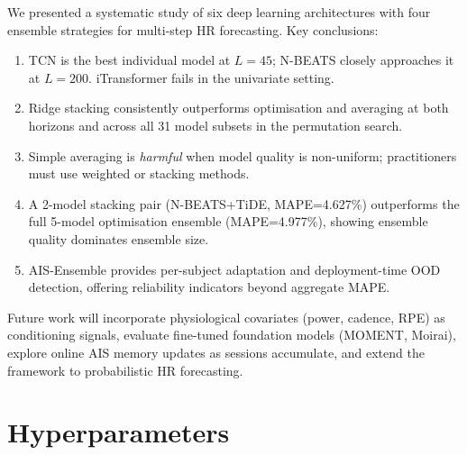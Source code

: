 \documentclass[conference]{IEEEtran}
\begin{document}
We presented a systematic study of six deep learning architectures with four
ensemble strategies for multi-step HR forecasting.  Key conclusions:
\begin{enumerate}[noitemsep,topsep=2pt]
  \item TCN is the best individual model at $L=45$; N-BEATS closely approaches
        it at $L=200$.  iTransformer fails in the univariate setting.
  \item Ridge stacking consistently outperforms optimisation and averaging at
        both horizons and across all 31 model subsets in the permutation search.
  \item Simple averaging is \emph{harmful} when model quality is non-uniform;
        practitioners must use weighted or stacking methods.
  \item A 2-model stacking pair (N-BEATS+TiDE, MAPE=4.627\%) outperforms the
        full 5-model optimisation ensemble (MAPE=4.977\%), showing ensemble
        quality dominates ensemble size.
  \item AIS-Ensemble provides per-subject adaptation and deployment-time OOD
        detection, offering reliability indicators beyond aggregate MAPE.
\end{enumerate}

Future work will incorporate physiological covariates (power, cadence, RPE) as
conditioning signals, evaluate fine-tuned foundation models (MOMENT, Moirai),
explore online AIS memory updates as sessions accumulate, and extend the
framework to probabilistic HR forecasting.

\appendix
\section{Hyperparameters}
\end{document}
